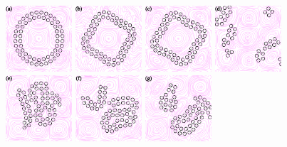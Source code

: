 \documentclass[aps,prl,preprint,groupedaddress]{revtex4-2}
\begin{document}
\begin{figure}
  \begin{center}
  \includegraphics[width=0.22\textwidth]{VTG_0.pdf}
  \includegraphics[width=0.22\textwidth]{VTG_1.pdf}
  \includegraphics[width=0.22\textwidth]{VTG_2.pdf} 
    \includegraphics[width=0.22\textwidth]{VTG_3.pdf} \\
      \includegraphics[width=0.22\textwidth]{BTG_0.pdf}
  \includegraphics[width=0.22\textwidth]{BTG_1.pdf}
  \includegraphics[width=0.22\textwidth]{BTG_2.pdf} 

\end{center}
\end{figure}
\end{document}
